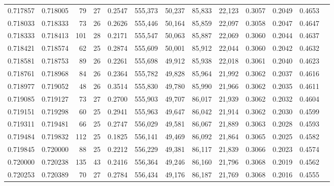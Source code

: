 \begin{tabular}{rrrrrrrrrrrrr}
0.717857 & 0.718005 &     79 &    27 &                                     0.2547 & 555,373 &  50,237 &  85,833 &  22,123 & 0.3057 & 0.2049 & 0.4653 \\
0.718033 & 0.718333 &     73 &    26 &                                     0.2626 & 555,446 &  50,164 &  85,859 &  22,097 & 0.3058 & 0.2047 & 0.4647 \\
0.718333 & 0.718413 &    101 &    28 &                                     0.2171 & 555,547 &  50,063 &  85,887 &  22,069 & 0.3060 & 0.2044 & 0.4637 \\
0.718421 & 0.718574 &     62 &    25 &                                     0.2874 & 555,609 &  50,001 &  85,912 &  22,044 & 0.3060 & 0.2042 & 0.4632 \\
0.718581 & 0.718753 &     89 &    26 &                                     0.2261 & 555,698 &  49,912 &  85,938 &  22,018 & 0.3061 & 0.2040 & 0.4623 \\
0.718761 & 0.718968 &     84 &    26 &                                     0.2364 & 555,782 &  49,828 &  85,964 &  21,992 & 0.3062 & 0.2037 & 0.4616 \\
0.718977 & 0.719052 &     48 &    26 &                                     0.3514 & 555,830 &  49,780 &  85,990 &  21,966 & 0.3062 & 0.2035 & 0.4611 \\
0.719085 & 0.719127 &     73 &    27 &                                     0.2700 & 555,903 &  49,707 &  86,017 &  21,939 & 0.3062 & 0.2032 & 0.4604 \\
0.719151 & 0.719298 &     60 &    25 &                                     0.2941 & 555,963 &  49,647 &  86,042 &  21,914 & 0.3062 & 0.2030 & 0.4599 \\
0.719311 & 0.719481 &     66 &    25 &                                     0.2747 & 556,029 &  49,581 &  86,067 &  21,889 & 0.3063 & 0.2028 & 0.4593 \\
0.719484 & 0.719832 &    112 &    25 &                                     0.1825 & 556,141 &  49,469 &  86,092 &  21,864 & 0.3065 & 0.2025 & 0.4582 \\
0.719845 & 0.720000 &     88 &    25 &                                     0.2212 & 556,229 &  49,381 &  86,117 &  21,839 & 0.3066 & 0.2023 & 0.4574 \\
0.720000 & 0.720238 &    135 &    43 &                                     0.2416 & 556,364 &  49,246 &  86,160 &  21,796 & 0.3068 & 0.2019 & 0.4562 \\
0.720253 & 0.720389 &     70 &    27 &                                     0.2784 & 556,434 &  49,176 &  86,187 &  21,769 & 0.3068 & 0.2016 & 0.4555 \\

\end{tabular}
